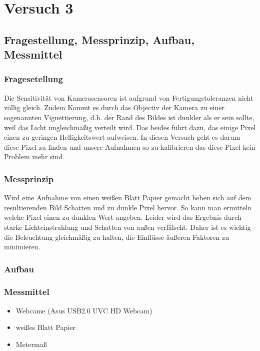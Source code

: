 \chapter{Versuch 3}
\label{chap:VERSUCH_3}

\section{Fragestellung, Messprinzip, Aufbau, Messmittel}
\label{chap:VERSUCH_3_FRAGESTELLUNG}

\subsection*{Fragesetellung}

Die Sensitivität von Kamerasensoren ist aufgrund von Fertigungstoleranzen nicht völlig gleich.
Zudem Kommt es durch das Objectiv der Kamera zu einer sogenannten Vignettierung, d.h. der Rand des Bildes ist dunkler als er sein sollte, weil das Licht ungleichmäßig verteilt wird.
Das beides führt dazu, das einige Pixel einen zu geringen Helligkeitswert aufweisen.
In diesen Versuch geht es darum diese Pixel zu finden und unsere Aufnahmen so zu kalibrieren das diese Pixel kein Problem mehr sind.

\subsection*{Messprinzip}
Wird eine Aufnahme von einen weißen Blatt Papier gemacht heben sich auf dem resultierenden Bild Schatten und zu dunkle Pixel hervor.
So kann man ermitteln welche Pixel einen zu dunklen Wert angeben.
Leider wird das Ergebnis durch starke Lichteinstrahlung und Schatten von außen verfälscht.
Daher ist es wichtig die Beleuchtung gleichmäßig zu halten, die Einflüsse äußeren Faktoren zu minimieren.

\subsection*{Aufbau}

\subsection{Messmittel}
\begin{itemize}
\item Webcame (Asus USB2.0 UVC HD Webcam)
\item weißes Blatt Papier
\item Metermaß
\end{itemize}


